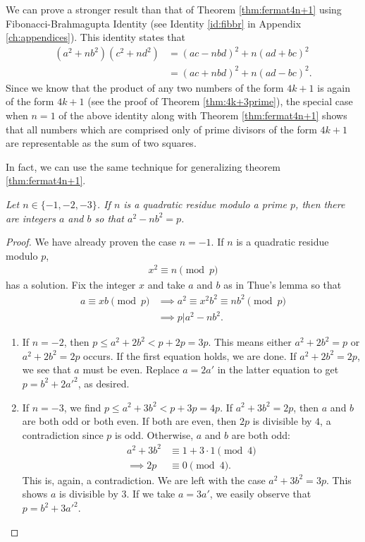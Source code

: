 \documentclass{subfile}
\begin{document}
	\begin{remark}
		We can prove a stronger result than that of Theorem \ref{thm:fermat4n+1} using Fibonacci-Brahmagupta Identity (see Identity \ref{id:fibbr} in Appendix \ref{ch:appendices}). This identity states that
		\begin{align*}
			(a^2+nb^2)(c^2+nd^2)&=(ac-nbd)^2+n(ad+bc)^2\\
			&=(ac+nbd)^2+n(ad-bc)^2.
		\end{align*}
	Since we know that the product of any two numbers of the form $4k+1$ is again of the form $4k+1$ (see the proof of Theorem \ref{thm:4k+3prime}), the special case when $n=1$ of the above identity along with Theorem \ref{thm:fermat4n+1} shows that all numbers which are comprised only of prime divisors of the form $4k+1$ are representable as the sum of two squares. 
	\end{remark}
	In fact, we can use the same technique for generalizing theorem \eqref{thm:fermat4n+1}.
	\begin{theorem}\slshape\label{thm:gen4n+1}
		Let $n\in\{-1,-2,-3\}$. If $n$ is a quadratic residue modulo a prime $p$, then there are integers $a$ and $b$ so that $a^2-nb^2=p$.
	\end{theorem}
	
	\begin{proof}
		We have already proven the case $n=-1$. If $n$ is a quadratic residue modulo $p$, 
		\begin{align*}
			x^2\equiv n\pmod p
		\end{align*}
		has a solution. Fix the integer $x$ and take $a$ and $b$ as in Thue's lemma so that
		\begin{align*}
			a \equiv xb\pmod p &\implies a^2 \equiv x^2b^2 \equiv nb^2\pmod p\\
			& \implies p  |a^2-nb^2.
		\end{align*}
		
		\begin{enumerate}
			\item If $n=-2$, then $p\leq a^2+2b^2<p+2p=3p$. This means either $a^2+2b^2=p$ or $a^2+2b^2=2p$ occurs. If the first equation holds, we are done. If $a^2+2b^2=2p$, we see that $a$ must be even. Replace $a=2a'$ in the latter equation to get $p=b^2+2a'^2$, as desired.
			\item If $n=-3$, we find $p\leq a^2+3b^2<p+3p=4p$. If $a^2+3b^2=2p$, then $a$ and $b$ are both odd or both even. If both are even, then $2p$ is divisible by $4$, a contradiction since $p$ is odd. Otherwise, $a$ and $b$ are both odd:
			\begin{align*}
				a^2+3b^2 & \equiv1+3\cdot 1\pmod 4\\
				\implies 2p	 & \equiv 0 \pmod 4.
			\end{align*}
			This is, again, a contradiction. We are left with the case $a^2+3b^2=3p$. This shows $a$ is divisible by $3$. If we take $a=3a'$, we easily observe that $p=b^2+3a'^2$.
		\end{enumerate}
	\end{proof}
\end{document}
